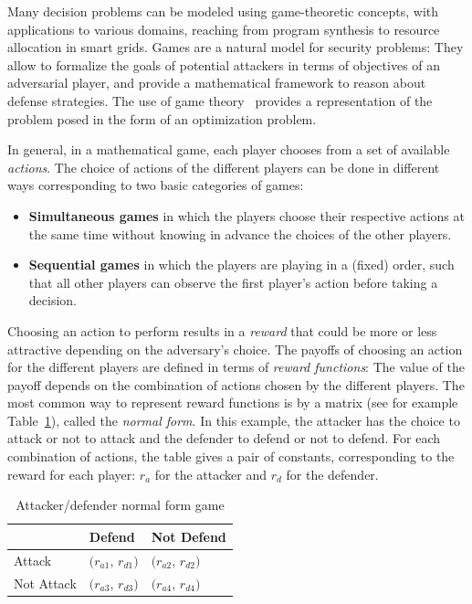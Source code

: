 Many decision problems can be modeled using game-theoretic concepts, with
applications to various domains, reaching from program synthesis to resource
allocation in smart grids. Games are a natural model for security problems: They
allow to formalize the goals of potential attackers in terms of objectives of an
adversarial player, and provide a mathematical framework to reason about defense
strategies. 
The use of game theory~\cite{prisner_game_2014} provides a representation of the problem posed in the form of an optimization problem.

In general, in a mathematical game, each player chooses from a set of available \emph{actions}. The choice of actions of the different players can be done in different ways corresponding to two basic categories of games:
\begin{itemize}
	\item \textbf{Simultaneous games} in which the players choose their respective actions at the same time without knowing in advance the choices of the other players.
	\item \textbf{Sequential games} in which the players are playing in a (fixed) order, such that all other players can observe the first player's action before taking a decision.
\end{itemize}

Choosing an action to perform results in a \emph{reward} that could be more or less attractive depending on the adversary's choice.
The payoffs of choosing an action for the different players are defined in terms of \emph{reward functions}: The value of the payoff depends on the combination of actions chosen by the different players. The most common way to represent reward functions is by a matrix (see for example Table~\ref{tab:normalform}), called the \textit{normal form}. In this example, the attacker has the choice to attack or not to attack and the defender to defend or not to defend.  For each combination of actions, the table gives a pair of constants, corresponding to the reward for each player: $r_a$ for the attacker and $r_d$ for the defender.

\begin{table}[h]
    \centering
    \caption{Attacker/defender normal form game \label{tab:normalform}}
    \begin{tabular}{l|l|l}
                & Defend               & Not Defend           \\ \hline
     Attack     & $(r_{a1}$, $r_{d1})$ & $(r_{a2}$, $r_{d2})$ \\ \hline
     Not Attack & $(r_{a3}$, $r_{d3})$ & $(r_{a4}$, $r_{d4})$
    \end{tabular}
\end{table}



